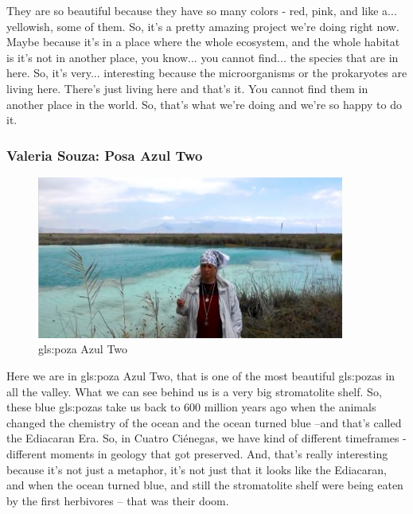 \documentclass[]{article}
\begin{document}
They are so beautiful because they have so many colors - red, pink, and like a... yellowish, some of them. So, it's a pretty amazing project we're doing right now. 
Maybe because it's in a place where the whole ecosystem, and the whole habitat is 
it's not in another place, you know... you cannot find... the species that are in here. So, it's very... interesting because the microorganisms or the prokaryotes are living here. There's just living here and that's it. You cannot find them in another place in the world. So, that's what we're doing and we're so happy to do it.

\subsubsection{Valeria Souza: Posa Azul Two}
\begin{figure}[H]
	\caption{\Gls{gls:poza} Azul Two} 
	\includegraphics[width=0.9\textwidth]{CuatroCienegas9}
\end{figure}

Here we are in \Gls{gls:poza} Azul Two, that is one of the most beautiful \gls{gls:poza}s in all the valley. What we can see behind us is a very big stromatolite shelf. So, these blue \gls{gls:poza}s take us back to 600 million years ago when the animals changed the chemistry of the ocean and the ocean turned blue --and that's called the Ediacaran Era. So, in Cuatro  Ci\'enegas, we have kind of different timeframes - different moments in geology that got preserved. And, that's really interesting because it's not just a metaphor, it's not just that it looks like the Ediacaran, and when the ocean turned blue, and still the stromatolite shelf were being eaten by the first herbivores -- that was their doom.
\end{document}
